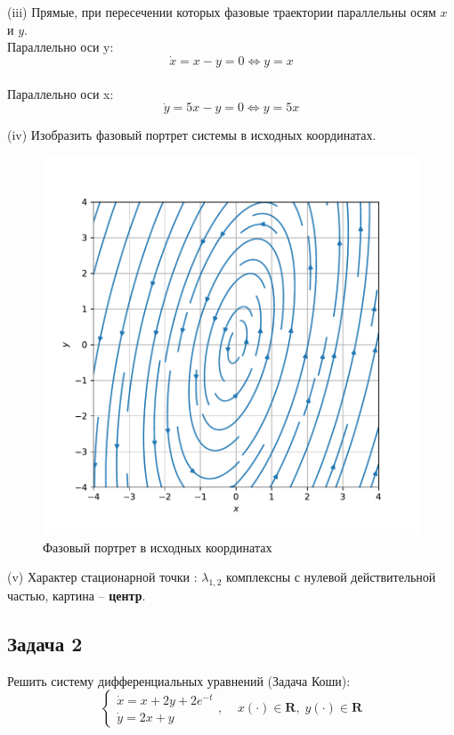 \documentclass[a4paper, 12pt]{article}
\begin{document}
(iii) Прямые, при пересечении которых фазовые траектории параллельны осям $x$ и $y$.\\
Параллельно оси y:
\[\dot{x} = x-y=0\Leftrightarrow y = x\]\\
Параллельно оси x:
\[\dot{y} = 5x-y=0\Leftrightarrow y = 5x\]





(iv) Изобразить фазовый портрет системы в исходных координатах.

\begin{figure}[H]
	\centering
	\includegraphics[scale=0.7]{3a1_1}
	\caption{Фазовый портрет в исходных координатах}
	\label{im:3a1_1}
\end{figure}
(v) Характер стационарной точки : $\lambda_{1,2}$ комплексны с нулевой действительной частью, картина -- \textbf{центр}.

	\subsection {Задача 2}
 Решить систему дифференциальных уравнений (Задача Коши): 
\begin{equation}
\left\{
\begin{array}{lr}
\dot{x} = x+2y+2e^{-t}\\
\dot{y} = 2x+y
\end{array}
\right.
, \;\;\;\; x(\cdot)\in \textbf{R},\; y(\cdot)\in \textbf{R}
\label{eq:16}
\end{equation}
\end{document}
